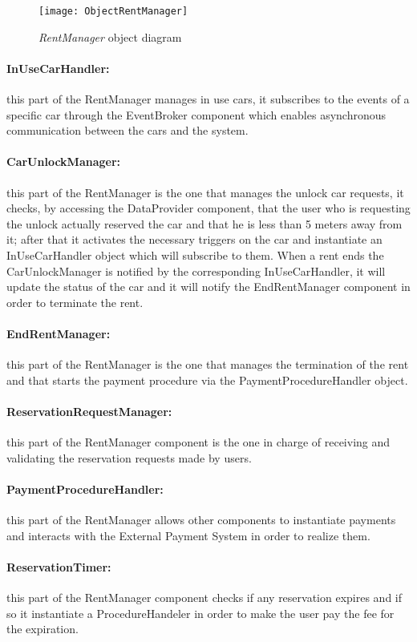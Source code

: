 \begin{figure}[h!]
	\centering
	\texttt{[image: ObjectRentManager]}
	\caption{
		\label{fig:rentObjectDiagram} 
		\emph{RentManager} object diagram
	}
\end{figure}
\clearpage
\paragraph{InUseCarHandler:} this part of the RentManager manages in use cars, it subscribes to the events of a specific car through the EventBroker component which enables asynchronous communication between the cars and the system.
\paragraph{CarUnlockManager:} this part of the RentManager is the one that manages the unlock car requests, it checks, by accessing the DataProvider component, that the user who is requesting the unlock actually reserved the car and that he is less than 5 meters away from it; after that it activates the necessary triggers on the car and instantiate an InUseCarHandler object which will subscribe to them. When a rent ends the CarUnlockManager is notified by the corresponding InUseCarHandler, it will update the status of the car and it will notify the EndRentManager component in order to terminate the rent.
\paragraph{EndRentManager:} this part of the RentManager is the one that manages the termination of the rent and that starts the payment procedure via the PaymentProcedureHandler object.
\paragraph{ReservationRequestManager:} this part of the RentManager component is the one in charge of receiving and validating the reservation requests made by users.
\paragraph{PaymentProcedureHandler:} this part of the RentManager allows other components to instantiate payments and interacts with the External Payment System in order to realize them.
\paragraph{ReservationTimer:} this part of the RentManager component checks if any reservation expires and if so it instantiate a ProcedureHandeler in order to make the user pay the fee for the expiration.
